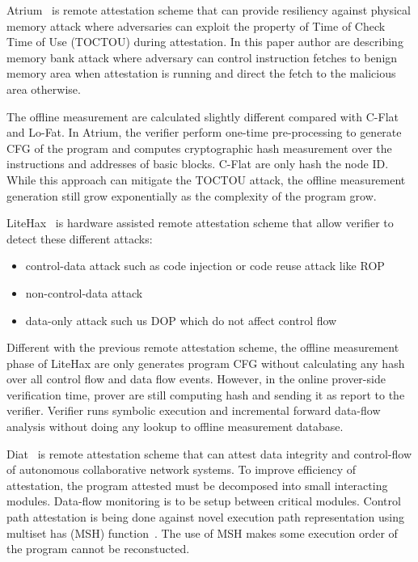 Atrium~\cite{zeitouniATRIUMRuntimeAttestation2017} is remote attestation scheme
that can provide resiliency against physical memory attack where adversaries can
exploit the property of Time of Check Time of Use (TOCTOU) during attestation.
In this paper author are describing memory bank attack where adversary can
control instruction fetches to benign memory area when attestation is running
and direct the fetch to the malicious area otherwise.

The offline measurement are calculated slightly different compared with C-Flat
and Lo-Fat. In Atrium, the verifier perform one-time pre-processing to generate
CFG of the program and computes cryptographic hash measurement over the
instructions and addresses of basic blocks. C-Flat are only hash the node ID.
While this approach can mitigate the TOCTOU attack, the offline measurement
generation still grow exponentially as the complexity of the program grow. 

LiteHax~\cite{dessoukyLiteHAXLightweightHardwareassisted2018} is hardware
assisted remote attestation scheme that allow verifier to detect these different
attacks:

\begin{itemize}
    \item control-data attack such as code injection or code reuse attack like ROP
    \item non-control-data attack
    \item data-only attack such us DOP which do not affect control flow
\end{itemize}

Different with the previous remote attestation scheme, the offline measurement
phase of LiteHax are only generates program CFG without calculating any hash
over all control flow and data flow events. However, in the online prover-side
verification time, prover are still computing hash and sending it as report to
the verifier. Verifier runs symbolic execution and incremental forward data-flow
analysis without doing any lookup to offline measurement database.

Diat~\cite{aberaDIATDataIntegrity2019} is remote attestation scheme that can
attest data integrity and control-flow of autonomous collaborative network
systems. To improve efficiency of attestation, the program attested must be
decomposed into small interacting modules. Data-flow monitoring is to be setup
between critical modules. Control path attestation is being done against novel
execution path representation using multiset has (MSH)
function~\cite{clarkeIncrementalMultisetHash2003}. The use of MSH makes some
execution order of the program cannot be reconstucted.

